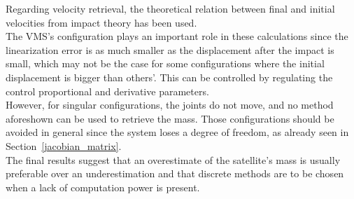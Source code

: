 \documentclass[a4paper,12pt,oneside]{report}
\begin{document}
Regarding velocity retrieval, the theoretical relation between final and initial velocities from impact theory has been used.\\
The VMS's configuration plays an important role in these calculations since the linearization error is as much smaller as the displacement after the impact is small, which may not be the case for some configurations where the initial displacement is bigger than others'. This can be controlled by regulating the control proportional and derivative parameters. \\
However, for singular configurations, the joints do not move, and no method aforeshown can be used to retrieve the mass. Those configurations should be avoided in general since the system loses a degree of freedom, as already seen in Section~\ref{jacobian_matrix}.\\
The final results suggest that an overestimate of the satellite's mass is usually preferable over an underestimation and that discrete methods are to be chosen when a lack of computation power is present.
\end{document}

